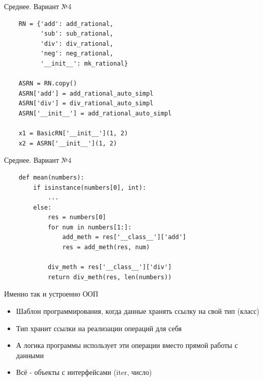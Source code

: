 \documentclass{article}
\begin{document}
\begin{center} Среднее. Вариант №4 \end{center}
\begin{lstlisting}
    RN = {'add': add_rational, 
          'sub': sub_rational,
          'div': div_rational,               
          'neg': neg_rational,               
          '__init__': mk_rational}

    ASRN = RN.copy()
    ASRN['add'] = add_rational_auto_simpl 
    ASRN['div'] = div_rational_auto_simpl 
    ASRN['__init__'] = add_rational_auto_simpl 

    x1 = BasicRN['__init__'](1, 2)
    x2 = ASRN['__init__'](1, 2)
\end{lstlisting}
\newpage

\begin{center}  Среднее. Вариант №4  \end{center}
\begin{lstlisting}
    def mean(numbers):
        if isinstance(numbers[0], int):
            ...
        else:
            res = numbers[0]
            for num in numbers[1:]:
                add_meth = res['__class__']['add']
                res = add_meth(res, num)

            div_meth = res['__class__']['div']
            return div_meth(res, len(numbers))
\end{lstlisting}
\newpage

\begin{center} Именно так и устроенно ООП \end{center}
\begin{itemize}
    \item Шаблон программирования, когда данные хранять ссылку на свой тип (класс)
    \item Тип хранит ссылки на реализации операций для себя
    \item А логика программы использует эти операции вместо прямой работы с данными
    \item Всё - объекты с интерфейсами (iter, число)
\end{itemize}
\newpage
\end{document}
